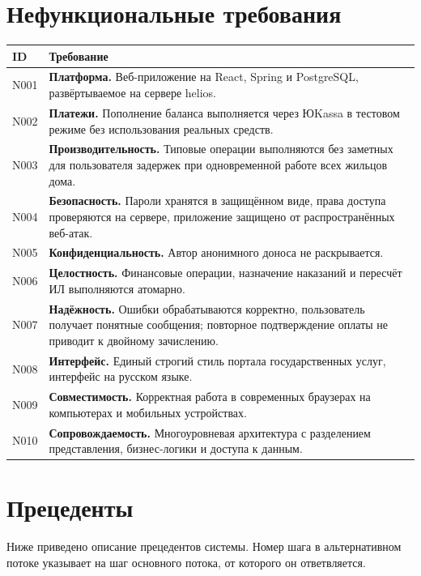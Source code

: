 \documentclass[12pt,a4paper]{article}
\newenvironment{reqtable}{%
  \begin{longtable}{L{14mm} L{146mm}}
  \toprule
  \textbf{ID} & \textbf{Требование} \\
  \midrule
  \endhead
  \bottomrule
  \endfoot
}{\end{longtable}}
\begin{document}
\section{Нефункциональные требования}

\begin{reqtable}
N001 & \textbf{Платформа.} Веб-приложение на React, Spring и PostgreSQL, развёртываемое на сервере helios. \\
N002 & \textbf{Платежи.} Пополнение баланса выполняется через ЮKassa в тестовом режиме без использования реальных средств. \\
N003 & \textbf{Производительность.} Типовые операции выполняются без заметных для пользователя задержек при одновременной работе всех жильцов дома. \\
N004 & \textbf{Безопасность.} Пароли хранятся в защищённом виде, права доступа проверяются на сервере, приложение защищено от распространённых веб-атак. \\
N005 & \textbf{Конфиденциальность.} Автор анонимного доноса не раскрывается. \\
N006 & \textbf{Целостность.} Финансовые операции, назначение наказаний и пересчёт ИЛ выполняются атомарно. \\
N007 & \textbf{Надёжность.} Ошибки обрабатываются корректно, пользователь получает понятные сообщения; повторное подтверждение оплаты не приводит к двойному зачислению. \\
N008 & \textbf{Интерфейс.} Единый строгий стиль портала государственных услуг, интерфейс на русском языке. \\
N009 & \textbf{Совместимость.} Корректная работа в современных браузерах на компьютерах и мобильных устройствах. \\
N010 & \textbf{Сопровождаемость.} Многоуровневая архитектура с разделением представления, бизнес-логики и доступа к данным. \\
\end{reqtable}

\section{Прецеденты}

Ниже приведено описание прецедентов системы. Номер шага в альтернативном
потоке указывает на шаг основного потока, от которого он ответвляется.
\end{document}
